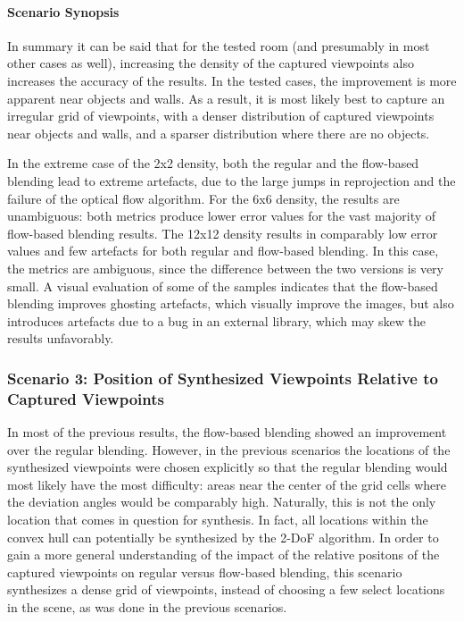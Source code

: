 \paragraph{Scenario Synopsis}
In summary it can be said that for the tested room (and presumably in most other cases as well), increasing the density of the captured viewpoints also increases the accuracy of the results. In the tested cases, the improvement is more apparent near objects and walls. As a result, it is most likely best to capture an irregular grid of viewpoints, with a denser distribution of captured viewpoints near objects and walls, and a sparser distribution where there are no objects.

In the extreme case of the 2x2 density, both the regular and the flow-based blending lead to extreme artefacts, due to the large jumps in reprojection and the failure of the optical flow algorithm.
For the 6x6 density, the results are unambiguous: both metrics produce lower error values for the vast majority of flow-based blending results.
The 12x12 density results in comparably low error values and few artefacts for both regular and flow-based blending. In this case, the metrics are ambiguous, since the difference between the two versions is very small. A visual evaluation of some of the samples indicates that the flow-based blending improves ghosting artefacts, which visually improve the images, but also introduces artefacts due to a bug in an external library, which may skew the results unfavorably.















\subsubsection{Scenario 3: Position of Synthesized Viewpoints Relative to Captured Viewpoints}
In most of the previous results, the flow-based blending showed an improvement over the regular blending. However, in the previous scenarios the locations of the synthesized viewpoints were chosen explicitly so that the regular blending would most likely have the most difficulty: areas near the center of the grid cells where the deviation angles would be comparably high. Naturally, this is not the only location that comes in question for synthesis. In fact, all locations within the convex hull can potentially be synthesized by the 2-DoF algorithm. In order to gain a more general understanding of the impact of the relative positons of the captured viewpoints on regular versus flow-based blending, this scenario synthesizes a dense grid of viewpoints, instead of choosing a few select locations in the scene, as was done in the previous scenarios.

